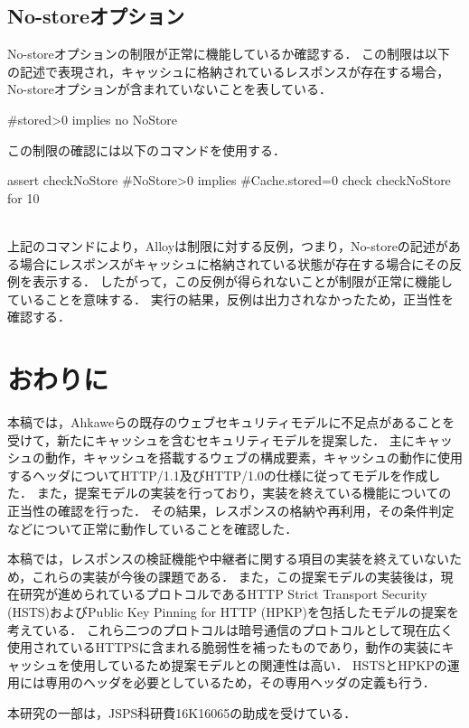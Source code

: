 \documentclass{css}
\begin{document}
\subsection{No-storeオプション}
No-storeオプションの制限が正常に機能しているか確認する．
この制限は以下の記述で表現され，キャッシュに格納されているレスポンスが存在する場合，No-storeオプションが含まれていないことを表している．
\begin{verbatimtab}[2]
	#stored>0 implies no NoStore
\end{verbatimtab}
この制限の確認には以下のコマンドを使用する．\\\hrulefill
\begin{small}
\begin{verbatimtab}[2]
assert checkNoStore{
	#NoStore>0 implies #Cache.stored=0
}
check checkNoStore for 10
\end{verbatimtab}
\end{small}
\hrulefill\\
上記のコマンドにより，Alloyは制限に対する反例，つまり，No-storeの記述がある場合にレスポンスがキャッシュに格納されている状態が存在する場合にその反例を表示する．
したがって，この反例が得られないことが制限が正常に機能していることを意味する．
実行の結果，反例は出力されなかったため，正当性を確認する．

\section{おわりに}
本稿では，Ahkaweらの既存のウェブセキュリティモデル\cite{webmodel}に不足点があることを受けて，新たにキャッシュを含むセキュリティモデルを提案した．
主にキャッシュの動作，キャッシュを搭載するウェブの構成要素，キャッシュの動作に使用するヘッダについてHTTP/1.1及びHTTP/1.0の仕様に従ってモデルを作成した．
また，提案モデルの実装を行っており，実装を終えている機能についての正当性の確認を行った．
その結果，レスポンスの格納や再利用，その条件判定などについて正常に動作していることを確認した．

本稿では，レスポンスの検証機能や中継者に関する項目の実装を終えていないため，これらの実装が今後の課題である．
また，この提案モデルの実装後は，現在研究が進められているプロトコルであるHTTP Strict Transport Security (HSTS)\cite{rfc6797}およびPublic Key Pinning for HTTP (HPKP)\cite{rfc7469}を包括したモデルの提案を考えている．
これら二つのプロトコルは暗号通信のプロトコルとして現在広く使用されているHTTPSに含まれる脆弱性を補ったものであり，動作の実装にキャッシュを使用しているため提案モデルとの関連性は高い．
HSTSとHPKPの運用には専用のヘッダを必要としているため，その専用ヘッダの定義も行う．

\begin{acknowledgment}
本研究の一部は，JSPS科研費16K16065の助成を受けている．
\end{acknowledgment}



\end{document}

